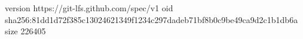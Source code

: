 version https://git-lfs.github.com/spec/v1
oid sha256:81dd1d72f385c13024621349f1234c297dadeb71bf8b0c9be49ca9d2c1b1db6a
size 226405
